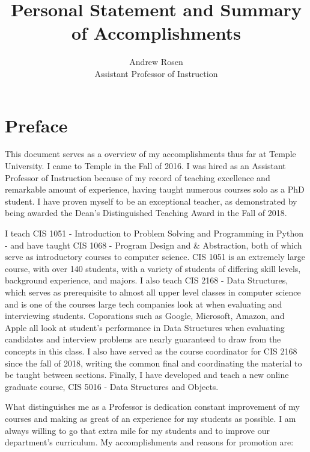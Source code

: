 \documentclass[10pt]{article}
\title{Personal Statement and Summary of Accomplishments}
\author{Andrew Rosen\\Assistant Professor of Instruction}
\date{}
\begin{document}
\maketitle


\section{Preface}
This document serves as a overview of my accomplishments thus far at Temple University.  
I came to Temple in the Fall of 2016.
I was hired as an Assistant Professor of Instruction because of my record of teaching excellence and remarkable amount of experience, having taught numerous courses solo as a PhD student.
I have proven myself to be an exceptional teacher, as demonstrated by being awarded the Dean's Distinguished Teaching Award in the Fall of 2018.

I teach CIS 1051 -  Introduction to Problem Solving and Programming in Python - and have taught CIS 1068 -  Program Design and \& Abstraction, both of which serve as introductory courses to computer science.
CIS 1051 is an extremely large course, with over 140 students, with a variety of students of differing skill levels, background experience, and majors.
I also teach CIS 2168 - Data Structures,  which serves as prerequisite to almost all upper level classes in computer science and is one of the courses large tech companies look at when evaluating and interviewing students.
Coporations such as Google, Microsoft, Amazon, and Apple all look at student's performance in Data Structures when evaluating candidates and  interview problems are nearly guaranteed to draw from the concepts in this class.  
I also have served as the course coordinator for CIS 2168 since the fall of 2018, writing the common final and coordinating the material to be taught between sections.
Finally, I have developed and teach a new online graduate course, CIS 5016 - Data Structures and Objects.

What distinguishes me as a Professor is dedication constant improvement of my courses and making as great of an experience for my students as possible.
I am always willing to go that extra mile for my students and to improve our department's curriculum.
My accomplishments and reasons for promotion are:
\end{document}
